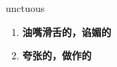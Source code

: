 
\begin{frame}
{\huge unctuous}
\begin{center}
\begin{enumerate}\Large
  \item \textbf{油嘴滑舌的，谄媚的}
  \item \textbf{夸张的，做作的}
\end{enumerate}
\end{center}
\end{frame}
